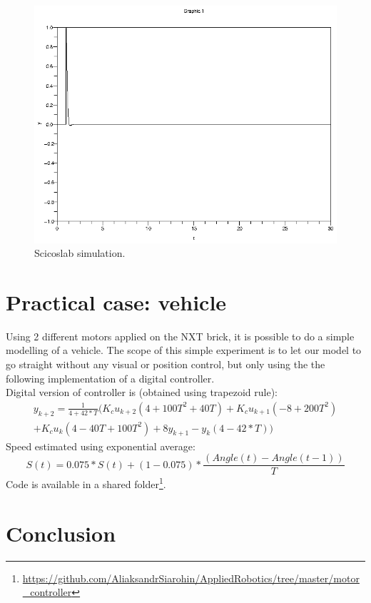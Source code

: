 \documentclass[a4paper,12pt,oneside]{article}
\begin{document}
\begin{figure}
	\centering
	\includegraphics[width=\columnwidth]{../controler/tracking_err.eps}
	\caption{Scicoslab simulation.}
	\label{fig:simulation_tracking_err}
\end{figure}

\section{Practical case: vehicle}
Using 2 different motors applied on the NXT brick, it is possible to do a simple modelling of a vehicle. The scope of this simple experiment is to let our model to go straight without any visual or position control, but only using the the following implementation of a digital controller.\\
Digital version of controller is (obtained using trapezoid rule):
\begin{multline}
y_{k+2} = \frac{1}{4 + 42 * T} (K_cu_{k+2}(4 + 100T^2 + 40T) + K_cu_{k+1}(-8 + 200T^2) \\+ K_cu_{k}(4 - 40T + 100T^2) + 8y_{k+1} - y_{k}(4 - 42*T))
\end{multline}
Speed estimated using exponential average:
\begin{equation}
S(t) = 0.075 * S(t) + (1 - 0.075) * \frac{(Angle(t) - Angle(t-1))}{T}
\end{equation}
Code is available in a shared folder\footnote{\url{https://github.com/AliaksandrSiarohin/AppliedRobotics/tree/master/motor_controller}}.

\section{Conclusion}
\end{document}
